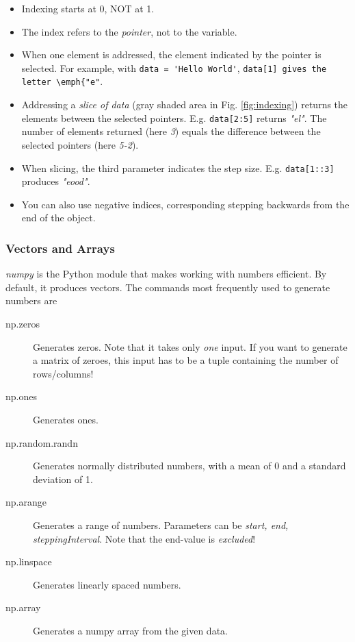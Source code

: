 \begin{itemize}
  \item Indexing starts at 0, NOT at 1.
  \item The index refers to the \emph{pointer}, not to the variable.
  \item When one element is addressed, the element indicated by the pointer is selected. For example, with \lstinline{data = 'Hello World'}, \lstinline{data[1] gives the letter \emph{"e"}.
  \item Addressing a \emph{slice of data} (gray shaded area in Fig. \ref{fig:indexing}) returns the elements between the selected pointers.
        E.g. \lstinline{data[2:5]} returns \emph{"el"}. The number of elements returned (here \emph{3}) equals the difference between the selected pointers (here \emph{5-2}).
  \item When slicing, the third parameter indicates the step size. E.g. \lstinline{data[1::3]} produces \emph{"eood"}.
  \item You can also use negative indices, corresponding stepping backwards from the end of the object.
\end{itemize}

\subsubsection{Vectors and Arrays}

\emph{numpy} is the Python module that makes working with numbers efficient. By default, it produces vectors. The commands most frequently used to generate numbers are

\begin{description}
  \item[np.zeros] Generates zeros. Note that it takes only \emph{one} input. If you want to generate a matrix of zeroes, this input has to be a tuple containing the number of rows/columns!
  \item[np.ones] Generates ones.
  \item[np.random.randn] Generates normally distributed numbers, with a mean of 0 and a standard deviation of 1.
  \item[np.arange] Generates a range of numbers. Parameters can be \emph{start, end, steppingInterval}. Note that the end-value is \emph{excluded}!
  \item[np.linspace] Generates linearly spaced numbers.
  \item[np.array] Generates a numpy array from the given data.
\end{description}

